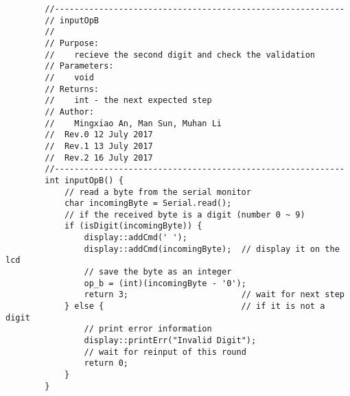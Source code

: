 \begin{verbatim}
        //-----------------------------------------------------------  
        // inputOpB 
        //  
        // Purpose:  
        //    recieve the second digit and check the validation
        // Parameters:  
        //    void 
        // Returns:  
        //    int - the next expected step   
        // Author:  
        //    Mingxiao An, Man Sun, Muhan Li
        //  Rev.0 12 July 2017
        //  Rev.1 13 July 2017
        //  Rev.2 16 July 2017
        //----------------------------------------------------------- 
        int inputOpB() {
            // read a byte from the serial monitor
            char incomingByte = Serial.read();  
            // if the received byte is a digit (number 0 ~ 9)       
            if (isDigit(incomingByte)) {                
                display::addCmd(' ');
                display::addCmd(incomingByte);  // display it on the lcd
                // save the byte as an integer
                op_b = (int)(incomingByte - '0');       
                return 3;                       // wait for next step
            } else {                            // if it is not a digit
                // print error information
                display::printErr("Invalid Digit"); 
                // wait for reinput of this round   
                return 0;                       
            }
        }


\end{verbatim}
